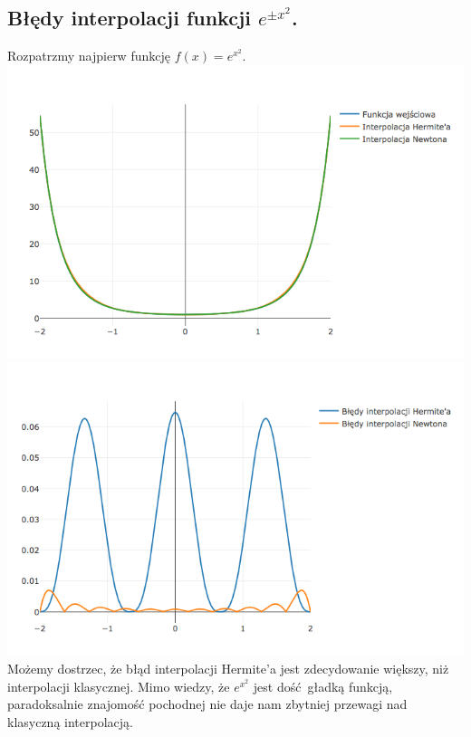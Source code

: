 \documentclass[10pt,wide]{mwart}
\theoremstyle{definition}
\begin{document}
\subsection{Błędy interpolacji funkcji \(e^{\pm x^2}\).}
Rozpatrzmy najpierw funkcję \(f(x) = e^{x^2}\).\\
\includegraphics[scale=0.7]{einter.png}
\includegraphics[scale=0.7]{eerror.png}
Możemy dostrzec, że błąd interpolacji Hermite'a jest zdecydowanie większy, niż interpolacji klasycznej.
Mimo wiedzy, że \(e^{x^2}\) jest dość gładką funkcją, paradoksalnie znajomość pochodnej nie daje nam zbytniej przewagi nad klasyczną interpolacją.
\end{document}
